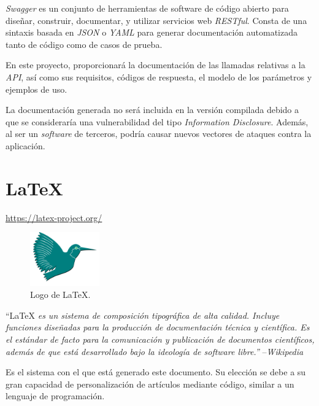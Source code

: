 \textit{Swagger} es un conjunto de herramientas de software de código abierto para diseñar, construir, documentar, y utilizar servicios web \textit{RESTful}. Consta de una sintaxis basada en \textit{JSON} o \textit{YAML} para generar documentación automatizada tanto de código como de casos de prueba.\sn

En este proyecto, proporcionará la documentación de las llamadas relativas a la \textit{API}, así como sus requisitos, códigos de respuesta, el modelo de los parámetros y ejemplos de uso.\sn

La documentación generada no será incluida en la versión compilada debido a que se consideraría una vulnerabilidad del tipo \textit{Information Disclosure}. Además, al ser un \textit{software} de terceros, podría causar nuevos vectores de ataques contra la aplicación. 


\section{\LaTeX} \label{sec:latex}

\footnotesize\color{gray}
\url{https://latex-project.org/}
\normalsize\color{black}\sn

\begin{figure}
\includegraphics[width=3cm]{img/tables/17_LaTeX.png}
\caption{Logo de \LaTeX.}
\label{fig:latex}
\end{figure}

``\LaTeX\textbf{ }\emph{es un sistema de composición tipográfica de alta calidad. Incluye funciones diseñadas para la producción de documentación técnica y científica. Es el estándar de facto para la comunicación y publicación de documentos científicos, además de que está desarrollado bajo la ideología de software libre.''
} --\textit{Wikipedia}\sn

Es el sistema con el que está generado este documento. Su elección se debe a su gran capacidad de personalización de artículos mediante código, similar a un lenguaje de programación.\sn


